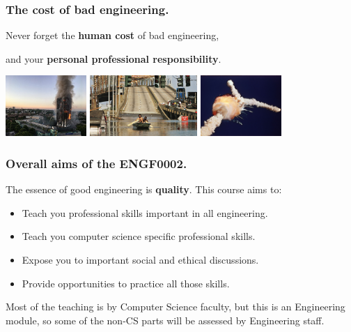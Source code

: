 \documentclass{beamer} %
\newcommand\emc[1]{\textcolor{midred}{\textbf{#1}}}
\begin{document}
\begin{frame}
\frametitle{The cost of bad engineering.}

Never forget the \emc{human cost} of bad engineering, 

and your \emc{personal professional responsibility}.

\vspace{10mm}
\centering
\includegraphics[height=23mm]{img/Grenfell.jpg} \quad
\includegraphics[height=23mm]{img/katrina.jpg} \quad
\includegraphics[height=23mm]{img/challenger.jpg}

\end{frame}

\begin{frame}
\frametitle{Overall aims of the ENGF0002.} 

The essence of good engineering is \emc{quality}. This course aims to:

\begin{itemize}
	\item Teach you professional skills important in all engineering.
	\item Teach you computer science specific professional skills.
	\item Expose you to important social and ethical discussions.
	\item Provide opportunities to practice all those skills.
\end{itemize}

\vspace{3mm} Most of the teaching is by Computer Science faculty, but this is
an Engineering module, so some of the non-CS parts will be assessed by
Engineering staff.

\end{frame}
\end{document}
